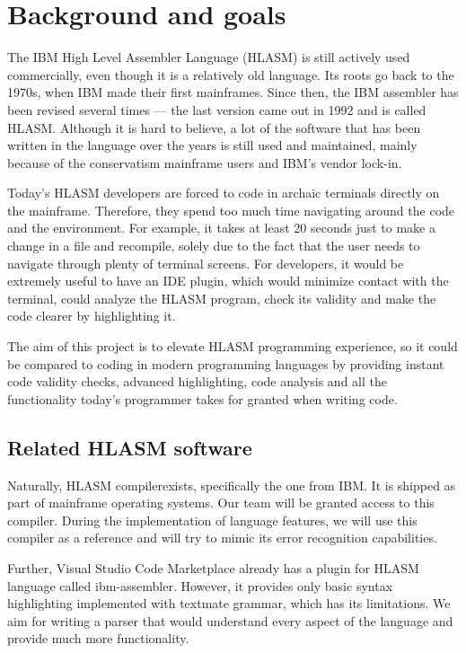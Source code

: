 \chapter{Background and goals}


The IBM High Level Assembler Language (HLASM) is still actively used commercially, even though it is a relatively old language. Its roots go back to the 1970s, when IBM made their first mainframes. Since then, the IBM assembler has been revised several times --- the last version came out in 1992 and is called HLASM. Although it is hard to believe, a lot of the software that has been written in the language over the years is still used and maintained, mainly because of the conservatism mainframe users and IBM's vendor lock-in.

Today's HLASM developers are forced to code in archaic terminals directly on the mainframe. Therefore, they spend too much time navigating around the code and the environment. For example, it takes at least 20 seconds just to make a change in a file and recompile, solely due to the fact that the user needs to navigate through plenty of terminal screens. For developers, it would be extremely useful to have an IDE plugin, which would minimize contact with the terminal, could analyze the HLASM program, check its validity and make the code clearer by highlighting it. 

The aim of this project is to elevate HLASM programming experience, so it could be compared to coding in modern programming languages by providing instant code validity checks, advanced highlighting, code analysis and all the functionality today's programmer takes for granted when writing code.

\section{Related HLASM software}
Naturally, HLASM compiler\footnotemark exists, specifically the one from IBM. It is shipped as part of mainframe operating systems. Our team will be granted access to this compiler. During the implementation of language features, we will use this compiler as a reference and will try to mimic its error recognition capabilities.

Further, Visual Studio Code Marketplace already has a plugin for HLASM language called ibm\nobreakdash-assembler\footnotemark. However, it provides only basic syntax highlighting implemented with textmate grammar, which has its limitations. We aim for writing a parser that would understand every aspect of the language and provide much more functionality.
